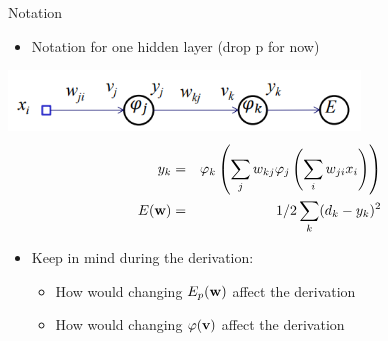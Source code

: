 \documentclass[notes]{beamer}
\providecommand{\tightlist}{%
  \setlength{\itemsep}{0pt}\setlength{\parskip}{0pt}}
\begin{document}
\begin{frame}{Notation}

\begin{itemize}
\tightlist
\item
  Notation for one hidden layer (drop p for now)
\end{itemize}

\centering 

\includegraphics[width=0.70000\textwidth]{2018-03-10-13-49-42.png}\\

\begin{eqnarray*}
   y_k &=& \varphi_k \left(\sum_j w_{kj} \varphi_j \left(\sum_i w_{ji} x_i \right) \right) \\
   E(\mathbf{w}) &=& 1/2 \sum_k (d_k - y_k)^2  
\end{eqnarray*}

\begin{itemize}
\tightlist
\item
  Keep in mind during the derivation:

  \begin{itemize}
  \tightlist
  \item
    How would changing \(E_p (\mathbf{w})\) affect the derivation
  \item
    How would changing \(\varphi (\mathbf{v})\) affect the derivation
  \end{itemize}
\end{itemize}

\end{frame}
\end{document}
